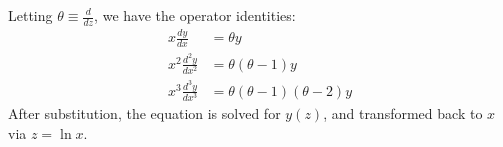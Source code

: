 Letting $\theta \equiv \frac{d}{dz}$, we have the operator identities:
\begin{align}
x \frac{dy}{dx} &= \theta y \\
x^2 \frac{d^2 y}{dx^2} &= \theta(\theta - 1)y \\
x^3 \frac{d^3 y}{dx^3} &= \theta(\theta - 1)(\theta - 2)y
\end{align}
After substitution, the equation is solved for $y(z)$, and transformed back to $x$ via $z = \ln x$.
